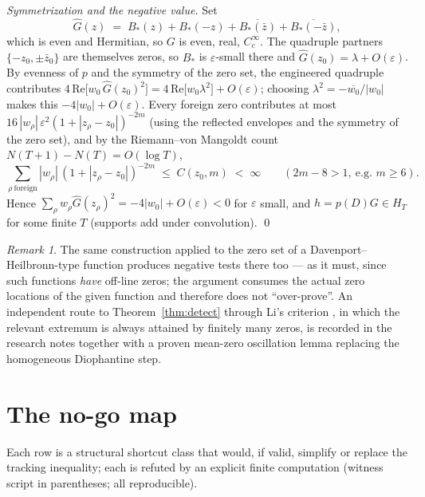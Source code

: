 \documentclass[11pt,reqno]{amsart}
\theoremstyle{plain}
\theoremstyle{definition}
\theoremstyle{remark}
\newtheorem{remark}[theorem]{Remark}
\begin{document}
\emph{Symmetrization and the negative value.} Set
\[
\hat G(z) \;=\; B_*(z) + B_*(-z) + \overline{B_*(\bar z)} + \overline{B_*(-\bar z)} ,
\]
which is even and Hermitian, so $G$ is even, real, $C_c^\infty$. The quadruple partners
$\{-z_0, \pm \bar z_0\}$ are themselves zeros, so $B_*$ is $\varepsilon$-small there and
$\hat G(z_0) = \lambda + O(\varepsilon)$. By evenness of $p$ and the symmetry of the zero
set, the engineered quadruple contributes
$4\,\mathrm{Re}\big[w_0\, \hat G(z_0)^2\big] = 4\,\mathrm{Re}\big[w_0 \lambda^2\big] +
O(\varepsilon)$; choosing $\lambda^2 = -\overline{w_0}/|w_0|$ makes this $-4|w_0| +
O(\varepsilon)$. Every foreign zero contributes at most
$16\, |w_\rho|\, \varepsilon^2 (1 + |z_\rho - z_0|)^{-2m}$ (using the reflected envelopes and
the symmetry of the zero set), and by the Riemann--von Mangoldt count
$N(T+1) - N(T) = O(\log T)$,
\[
\sum_{\rho \ \mathrm{foreign}} |w_\rho|\,(1 + |z_\rho - z_0|)^{-2m}
\;\le\; C(z_0, m) \;<\; \infty \qquad (2m - 8 > 1,\ \text{e.g. } m \ge 6).
\]
Hence $\sum_\rho w_\rho \hat G(z_\rho)^2 = -4|w_0| + O(\varepsilon) < 0$ for $\varepsilon$
small, and $h = p(D)G \in H_T$ for some finite $T$ (supports add under convolution). \qed

\begin{remark}
The same construction applied to the zero set of a Davenport--Heilbronn-type function
produces negative tests there too --- as it must, since such functions \emph{have} off-line
zeros; the argument consumes the actual zero locations of the given function and therefore
does not ``over-prove''. An independent route to Theorem~\ref{thm:detect} through Li's
criterion \cite{Li97,BombieriLagarias99}, in which the relevant extremum is always attained
by finitely many zeros, is recorded in the research notes together with a proven mean-zero
oscillation lemma replacing the homogeneous Diophantine step.
\end{remark}

\section{The no-go map}\label{sec:nogo}

Each row is a structural shortcut class that would, if valid, simplify or replace the
tracking inequality; each is refuted by an explicit finite computation (witness script in
parentheses; all reproducible).
\end{document}
